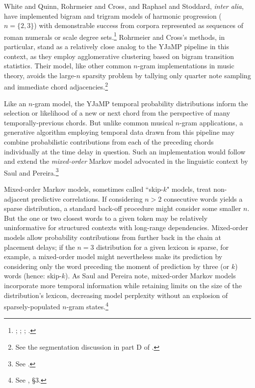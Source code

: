 \begin{enumerate}
White and Quinn, Rohrmeier and Cross, and Raphael and Stoddard, \emph{inter alia}, have implemented bigram and trigram models of harmonic progression ($n=\{2,3\}$) with demonstrable success from corpora represented as sequences of roman numerals or scale degree sets.\footnote{\cite{white2013}; \cite{wq2017}; \cite{rohrmeier2008}; \cite{raphael2004}.}  Rohrmeier and Cross's methods, in particular, stand as a relatively close analog to the YJaMP pipeline in this context, as they employ agglomerative clustering based on bigram transition statistics.  Their model, like other common $n$-gram implementations in music theory, avoids the large-$n$ sparsity problem by tallying only quarter note sampling and immediate chord adjacencies.\footnote{See the segmentation discussion in part D of \cite{rohrmeier2008}.}

Like an $n$-gram model, the YJaMP temporal probability distributions inform the selection or likelihood of a new or next chord from the perspective of many temporally-previous chords.  But unlike common musical $n$-gram applications, a generative algorithm employing temporal data drawn from this pipeline may combine probabilistic contributions from each of the preceding chords individually at the time delay in question. Such an implementation would follow and extend the \emph{mixed-order} Markov model advocated in the linguistic context by Saul and Pereira.\footnote{See \cite{saul1997}.}

Mixed-order Markov models, sometimes called ``skip-$k$" models, treat non-adjacent predictive correlations.  If considering $n>2$ consecutive words yields a sparse distribution, a standard back-off procedure might consider some smaller $n$. But the one or two closest words to a given token may be relatively uninformative for structured contexts with long-range dependencies.  Mixed-order models allow probability contributions from further back in the chain at placement delays; if the $n=3$ distribution for a given lexicon is sparse, for example, a mixed-order model might nevertheless make its prediction by considering only the word preceding the moment of prediction by three (or $k$) words (hence: skip-$k$).  As Saul and Pereira note, mixed-order Markov models incorporate more temporal information while retaining limits on the size of the distribution's lexicon, decreasing model perplexity without an explosion of sparsely-populated $n$-gram states.\footnote{See \cite{saul1997}, \S 3.}


\end{enumerate}
